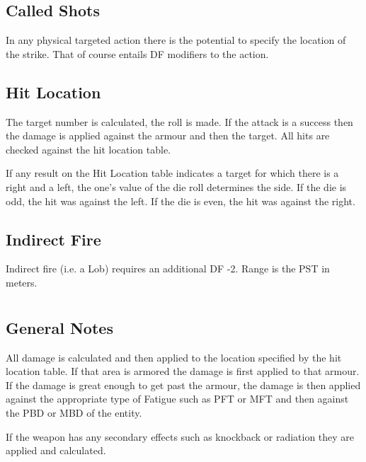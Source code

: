 \subsection{Called Shots}

In any physical targeted action there is the potential to specify the
location of the strike. That of course entails DF modifiers to the
action.
\index{}



\subsection{Hit Location}

The target number is calculated, the roll is made. If the attack
is a success then the damage is applied against the armour and then
the target.
All hits are checked against the hit location table.



If any result on the Hit Location table indicates a target for which there
is a right and a left, the one's value of the die roll determines the side.
If the die is odd, the hit was against the left. If the die is even, the hit
was against the right.

\subsection{Indirect Fire}

Indirect fire (i.e. a Lob) requires an additional DF -2. Range is the
PST in meters.

\section{}

\subsection{General Notes}

All damage is calculated and then applied to the location specified
by the hit location table. If that area is armored the damage is
first applied to that armour. If the damage is great enough to get
past the armour, the damage is then applied against the
appropriate type of Fatigue such as PFT or MFT and then against the
PBD or MBD of the entity.

If the weapon has any secondary effects such as knockback or radiation
they are applied and calculated.

